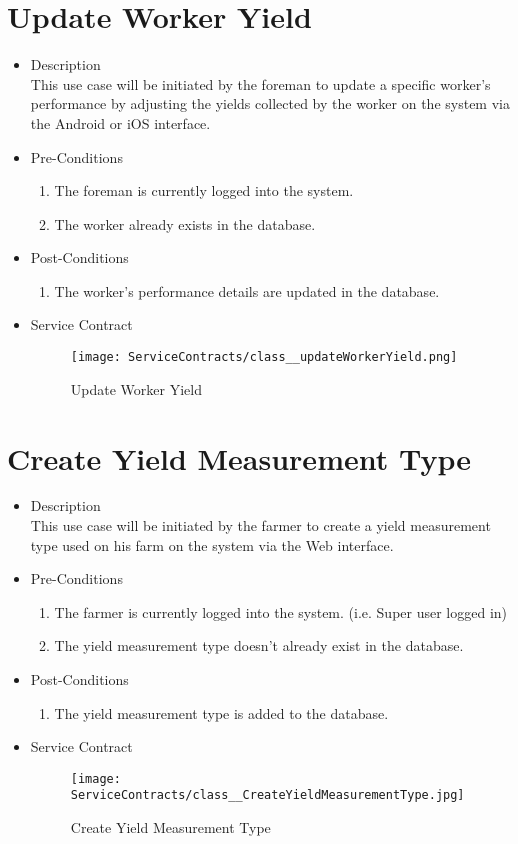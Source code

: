 \documentclass[11pt,fleqn]{book} %
\begin{document}
\section{Update Worker Yield}
\begin{itemize}
	\item Description\\
	This use case will be initiated by the foreman to update a specific worker’s performance by adjusting the yields collected by the worker on the system via the Android or iOS interface.
	\item Pre-Conditions
	\begin{enumerate}
		\item The foreman is currently logged into the system.
		\item The worker already exists in the database.			
	\end{enumerate}
	\item Post-Conditions
	\begin{enumerate}
		\item The worker’s performance details are updated in the database.
	\end{enumerate}
	\item Service Contract
	\begin{figure}
		\texttt{[image: ServiceContracts/class\_\_updateWorkerYield.png]}
		\caption{Update Worker Yield}
	\end{figure}
\end{itemize}

\section{Create Yield Measurement Type}
\begin{itemize}
	\item Description\\
	This use case will be initiated by the farmer to create a yield measurement type used on his farm on the system via the Web interface.
	\item Pre-Conditions
	\begin{enumerate}
		\item The farmer is currently logged into the system. (i.e. Super user logged in)
		\item The yield measurement type doesn’t already exist in the database. 				
	\end{enumerate}
	\item Post-Conditions
	\begin{enumerate}
		\item The yield measurement type is added to the database.
	\end{enumerate}
	\item Service Contract
	\begin{figure}
		\texttt{[image: ServiceContracts/class\_\_CreateYieldMeasurementType.jpg]}
		\caption{Create Yield Measurement Type}
	\end{figure}
\end{itemize}
\end{document}
